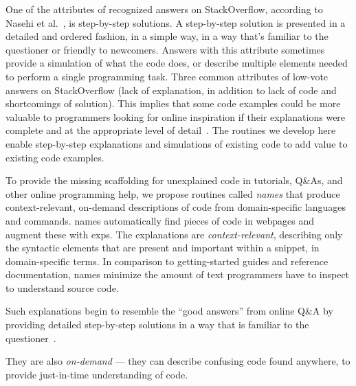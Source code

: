 \begin{changes}
One of the attributes of recognized answers on StackOverflow, according to Nasehi et al.~\cite{nasehi_what_2012}, is step-by-step solutions.
A step-by-step solution is presented in a detailed and ordered fashion, in a simple way, in a way that's familiar to the questioner or friendly to newcomers.
Answers with this attribute sometimes provide a simulation of what the code does, or describe multiple elements needed to perform a single programming task. 
Three common attributes of low-vote answers on StackOverflow (lack of explanation, in addition to lack of code and shortcomings of solution).
This implies that some code examples could be more valuable to programmers looking for online inspiration if their explanations were complete and at the appropriate level of detail~\cite{nasehi_what_2012}.
\fi
The routines we develop here enable step-by-step explanations and simulations of existing code to add value to existing code examples.
\end{changes}
\fi

To provide the missing scaffolding for unexplained code in tutorials, Q\&As, and other online programming help, we propose routines called \emph{\Glspl{name}} that produce context-relevant, on-demand descriptions of code from domain-specific languages and commands.
\Glspl{name} automatically find pieces of code in webpages and augment these with \glspl{exp}.
The explanations are \emph{context-relevant}, describing only the syntactic elements that are present and important within a snippet, in domain-specific terms.
In comparison to getting-started guides and reference documentation, \glspl{name} minimize the amount of text programmers have to inspect to understand source code.
\begin{changes}
Such explanations begin to resemble the ``good answers'' from online Q\&A by providing detailed step-by-step solutions in a way that is familiar to the questioner~\cite{nasehi_what_2012}.
\end{changes}
They are also \emph{on-demand} --- they can describe confusing code found anywhere, to provide just-in-time understanding of code.

